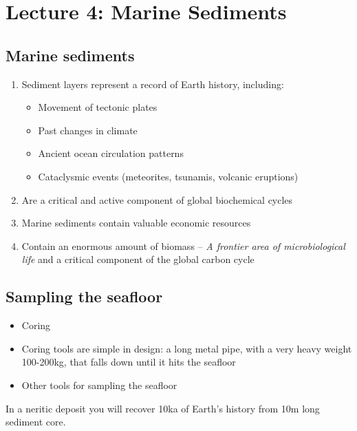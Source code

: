 
\section{Lecture 4: Marine Sediments}

\subsection{Marine sediments}

\begin{enumerate}
    \item Sediment layers represent a record of Earth history, including:
    \begin{itemize}
        \item Movement of tectonic plates
        \item Past changes in climate
        \item Ancient ocean circulation patterns
        \item Cataclysmic events (meteorites, tsunamis, volcanic eruptions)
    \end{itemize}
    \item Are a critical and active component of global
        biochemical cycles
    \item Marine sediments contain valuable economic resources
    \item Contain an enormous amount of biomass -- \textit{A frontier
        area of microbiological life} and a critical component of the global
        carbon cycle
\end{enumerate}

\subsection{Sampling the seafloor}

\begin{itemize}
    \item Coring
    \item Coring tools are simple in design: a long metal pipe, with a
        very heavy weight 100-200kg, that falls down until it hits the
        seafloor
    \item Other tools for sampling the seafloor
\end{itemize}

In a neritic deposit you will recover 10ka of Earth's history
from 10m long sediment core.

